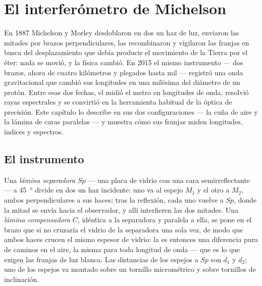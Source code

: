 \chapter{El interferómetro de Michelson}\label{ch:b2:michelson}

En 1887 Michelson y Morley desdoblaron en dos un haz de luz, enviaron las
mitades por brazos perpendiculares, las recombinaron y vigilaron las
franjas en busca del desplazamiento que debía producir el movimiento de la
Tierra por el éter: nada se movió, y la física cambió. En 2015 el mismo
instrumento --- dos brazos, ahora de cuatro kilómetros y plegados hasta
mil --- registró una onda gravitacional que cambió sus longitudes en una
milésima del diámetro de un protón. Entre esas dos fechas, el
 midió el metro en longitudes de onda, resolvió
rayas espectrales y se convirtió en la herramienta habitual de la óptica
de precisión. Este capítulo lo describe en sus dos configuraciones --- la
cuña de aire y la lámina de caras paralelas --- y muestra cómo sus franjas
miden longitudes, índices y espectros.

\section{El instrumento}

\begin{definition}\label{def:b2:michelson:instrument}
Una \emph{lámina separadora} $Sp$ --- una placa de vidrio con una cara semirreflectante
--- a \qty{45}{\degree} divide en dos un haz incidente: uno va al
espejo $M_1$ y el otro a $M_2$, ambos perpendiculares a sus haces; tras
la reflexión, cada uno vuelve a $Sp$, donde la mitad se envía hacia el
observador, y allí interfieren las dos mitades. Una \emph{lámina compensadora}
$C$, idéntica a la separadora y paralela a ella, se pone en el brazo
que si no cruzaría el vidrio de la separadora una sola vez, de modo que ambos
haces crucen el mismo espesor de vidrio: la  es entonces una
diferencia pura de caminos en el aire, la misma para toda longitud de onda --- que es
lo que exigen las franjas de luz blanca. Las distancias de los espejos a $Sp$ son $d_1$
y $d_2$; uno de los espejos va montado sobre un tornillo micrométrico y sobre tornillos
de inclinación.
\end{definition}

